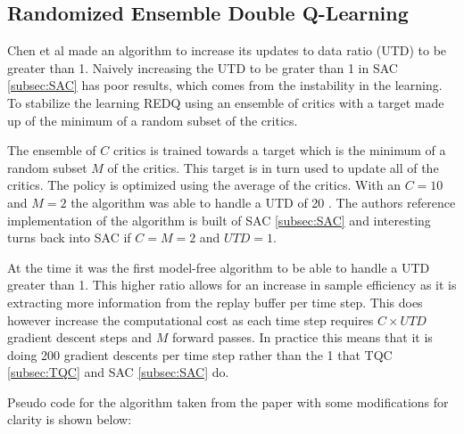 \subsection{Randomized Ensemble Double Q-Learning}\label{subsec:REDQ}

Chen et al \cite{chenRandomizedEnsembledDouble2021} made an algorithm to increase its updates to data ratio (UTD) to be greater than 1. Naively increasing the UTD to be grater than 1 in SAC \ref{subsec:SAC} has poor results, which comes from the instability in the learning. To stabilize the learning REDQ using an ensemble of critics with a target made up of the minimum of a random subset of the critics.

The ensemble of $C$ critics is trained towards a target which is the minimum of a random subset $M$ of the critics. This target is in turn used to update all of the critics. The policy is optimized using the average of the critics. With an $C = 10$ and $M = 2$ the algorithm was able to handle a UTD of 20 \cite{chenRandomizedEnsembledDouble2021}. The authors reference implementation of the algorithm is built of SAC \ref{subsec:SAC} and interesting turns back into SAC if $C=M=2$ and $UTD=1$.

At the time it was the first model-free algorithm to be able to handle a UTD greater than 1. This higher ratio allows for an increase in sample efficiency as it is extracting more information from the replay buffer per time step. This does however increase the computational cost as each time step requires $C \times UTD$ gradient descent steps and $M$ forward passes. In practice this means that it is doing 200 gradient descents per time step rather than the 1 that TQC \ref{subsec:TQC} and SAC \ref{subsec:SAC} do.

Pseudo code for the algorithm taken from the paper \cite{chenRandomizedEnsembledDouble2021} with some modifications for clarity is shown below:


